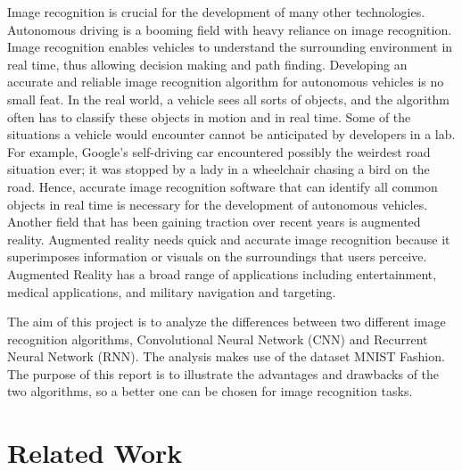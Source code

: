 \documentclass[letterpaper]{article} %
\begin{document}
 Image recognition is crucial for the development of many other technologies. Autonomous driving is a booming field with heavy reliance on image recognition. Image recognition enables vehicles to understand the surrounding environment in real time, thus allowing decision making and path finding. Developing an accurate and reliable image recognition algorithm for autonomous vehicles is no small feat. In the real world, a vehicle sees all sorts of objects, and the algorithm often has to classify these objects in motion and in real time. Some of the situations a vehicle would encounter cannot be anticipated by developers in a lab. For example, Google’s self-driving car encountered possibly the weirdest road situation ever; it was stopped by a lady in a wheelchair chasing a bird on the road. \cite{birdchasing} Hence, accurate image recognition software that can identify all common objects in real time is necessary for the development of autonomous vehicles. Another field that has been gaining traction over recent years is augmented reality. Augmented reality needs quick and accurate image recognition because it superimposes information or visuals on the surroundings that users perceive. Augmented Reality has a broad range of applications including entertainment, medical applications, and military navigation and targeting. \cite{ar}

 The aim of this project is to analyze the differences between two different image recognition algorithms, Convolutional Neural Network (CNN) and Recurrent Neural Network (RNN). The analysis makes use of the dataset MNIST Fashion. The purpose of this report is to illustrate the advantages and drawbacks of the two algorithms, so a better one can be chosen for image recognition tasks.


\section{Related Work}
\end{document}
